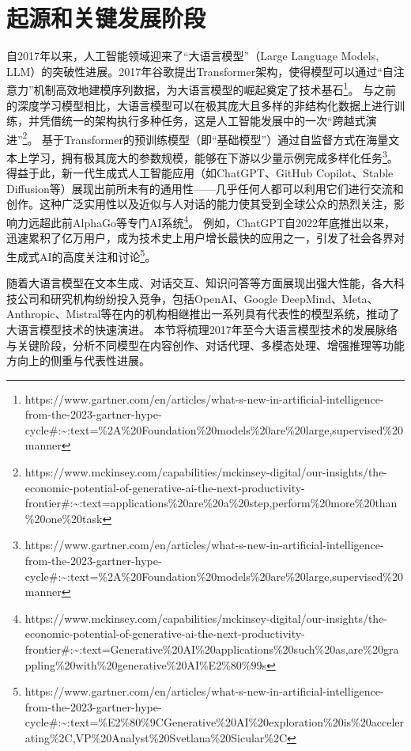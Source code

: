\documentclass[
  letterpaper,
]{scrbook}
\begin{document}
\section{起源和关键发展阶段}\label{ux8d77ux6e90ux548cux5173ux952eux53d1ux5c55ux9636ux6bb5}

自2017年以来，人工智能领域迎来了``大语言模型''（Large Language Models,
LLM）的突破性进展。2017年谷歌提出Transformer架构，使得模型可以通过``自注意力''机制高效地建模序列数据，为大语言模型的崛起奠定了技术基石\footnote{https://www.gartner.com/en/articles/what-s-new-in-artificial-intelligence-from-the-2023-gartner-hype-cycle\#:\textasciitilde:text=\%2A\%20Foundation\%20models\%20are\%20large,supervised\%20manner}。
与之前的深度学习模型相比，大语言模型可以在极其庞大且多样的非结构化数据上进行训练，并凭借统一的架构执行多种任务，这是人工智能发展中的一次``跨越式演进''\footnote{https://www.mckinsey.com/capabilities/mckinsey-digital/our-insights/the-economic-potential-of-generative-ai-the-next-productivity-frontier\#:\textasciitilde:text=applications\%20are\%20a\%20step,perform\%20more\%20than\%20one\%20task}。
基于Transformer的预训练模型（即``基础模型''）通过自监督方式在海量文本上学习，拥有极其庞大的参数规模，能够在下游以少量示例完成多样化任务\footnote{https://www.gartner.com/en/articles/what-s-new-in-artificial-intelligence-from-the-2023-gartner-hype-cycle\#:\textasciitilde:text=\%2A\%20Foundation\%20models\%20are\%20large,supervised\%20manner}。
得益于此，新一代生成式人工智能应用（如ChatGPT、GitHub Copilot、Stable
Diffusion等）展现出前所未有的通用性------几乎任何人都可以利用它们进行交流和创作。这种广泛实用性以及近似与人对话的能力使其受到全球公众的热烈关注，影响力远超此前AlphaGo等专门AI系统\footnote{https://www.mckinsey.com/capabilities/mckinsey-digital/our-insights/the-economic-potential-of-generative-ai-the-next-productivity-frontier\#:\textasciitilde:text=Generative\%20AI\%20applications\%20such\%20as,are\%20grappling\%20with\%20generative\%20AI\%E2\%80\%99s}。
例如，ChatGPT自2022年底推出以来，迅速累积了亿万用户，成为技术史上用户增长最快的应用之一，引发了社会各界对生成式AI的高度关注和讨论\footnote{https://www.gartner.com/en/articles/what-s-new-in-artificial-intelligence-from-the-2023-gartner-hype-cycle\#:\textasciitilde:text=\%E2\%80\%9CGenerative\%20AI\%20exploration\%20is\%20accelerating\%2C,VP\%20Analyst\%20Svetlana\%20Sicular\%2C}。

随着大语言模型在文本生成、对话交互、知识问答等方面展现出强大性能，各大科技公司和研究机构纷纷投入竞争，包括OpenAI、Google
DeepMind、Meta、Anthropic、Mistral等在内的机构相继推出一系列具有代表性的模型系统，推动了大语言模型技术的快速演进。
本节将梳理2017年至今大语言模型技术的发展脉络与关键阶段，分析不同模型在内容创作、对话代理、多模态处理、增强推理等功能方向上的侧重与代表性进展。
\end{document}
